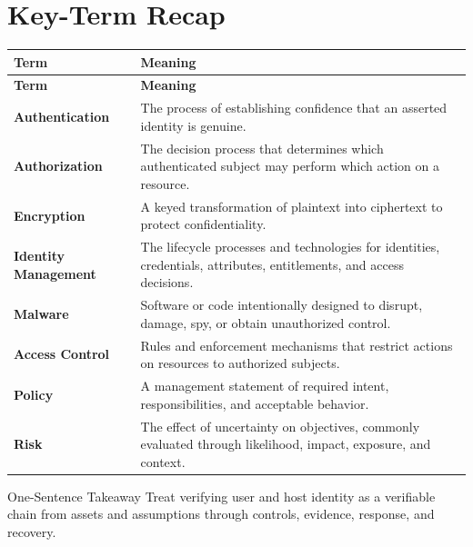 \documentclass[11pt,letterpaper]{article}
\begin{document}
\section*{Key-Term Recap}
\begin{longtable}{>{\raggedright\arraybackslash}p{}>{\raggedright\arraybackslash}p{}}
\toprule\rowcolor{Navy}\color{white}\textbf{Term} & \color{white}\textbf{Meaning}\\\midrule
\endfirsthead
\toprule\rowcolor{Navy}\color{white}\textbf{Term} & \color{white}\textbf{Meaning}\\\midrule
\endhead
\textbf{Authentication} & The process of establishing confidence that an asserted identity is genuine. \\\midrule
\textbf{Authorization} & The decision process that determines which authenticated subject may perform which action on a resource. \\\midrule
\textbf{Encryption} & A keyed transformation of plaintext into ciphertext to protect confidentiality. \\\midrule
\textbf{Identity Management} & The lifecycle processes and technologies for identities, credentials, attributes, entitlements, and access decisions. \\\midrule
\textbf{Malware} & Software or code intentionally designed to disrupt, damage, spy, or obtain unauthorized control. \\\midrule
\textbf{Access Control} & Rules and enforcement mechanisms that restrict actions on resources to authorized subjects. \\\midrule
\textbf{Policy} & A management statement of required intent, responsibilities, and acceptable behavior. \\\midrule
\textbf{Risk} & The effect of uncertainty on objectives, commonly evaluated through likelihood, impact, exposure, and context. \\\midrule
\bottomrule
\end{longtable}
\begin{CornellExamBox}{One-Sentence Takeaway}
Treat verifying user and host identity as a verifiable chain from assets and assumptions through controls, evidence, response, and recovery.
\end{CornellExamBox}
\end{document}

